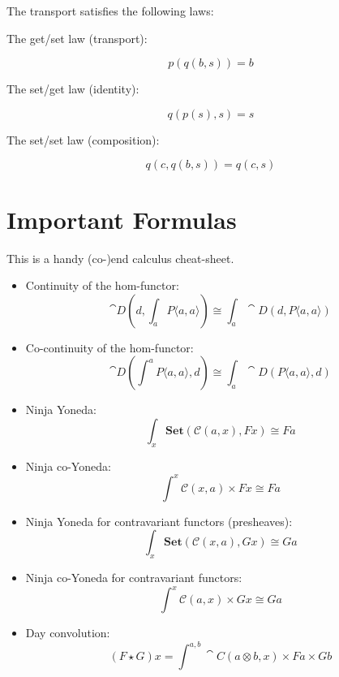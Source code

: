 \documentclass[DaoFP]{subfiles}
\begin{document}
The transport satisfies the following laws:

The get/set law (transport):

\[ p (q (b, s)) = b \]

The set/get law (identity):

\[ q ( p (s), s) = s \]

The set/set law (composition):

\[ q (c, q (b, s)) = q (c, s) \]

\section{Important Formulas}
This is a handy (co-)end calculus cheat-sheet.
\begin{itemize}
\item Continuity of the hom-functor:
\[\cat D\left(d, \int_a P\langle a, a \rangle \right) \cong \int_a \cat D \left(d, P\langle a, a \rangle \right) \]
\item Co-continuity of the hom-functor:
\[\cat D\left( \int^a P\langle a, a \rangle , d \right) \cong \int_a \cat D \left( P\langle a, a \rangle, d \right) \]
\item Ninja Yoneda:
\[ \int_{x} \mathbf{Set} (\mathcal{C}(a, x), F x) \cong F a \]
\item Ninja co-Yoneda:
\[ \int^{x} \mathcal{C}(x, a) \times F x \cong F a \]
\item Ninja Yoneda for contravariant functors (presheaves):
\[ \int_{x} \mathbf{Set} (\mathcal{C}(x, a), G x) \cong G a \]
\item Ninja co-Yoneda for contravariant functors:
\[ \int^{x} \mathcal{C}(a, x) \times G x \cong G a \]
\item Day convolution:
\[ (F \star G) x = \int^{a, b} \cat C (a \otimes b, x) \times F a \times G b \]

\end{itemize}
\end{document}
